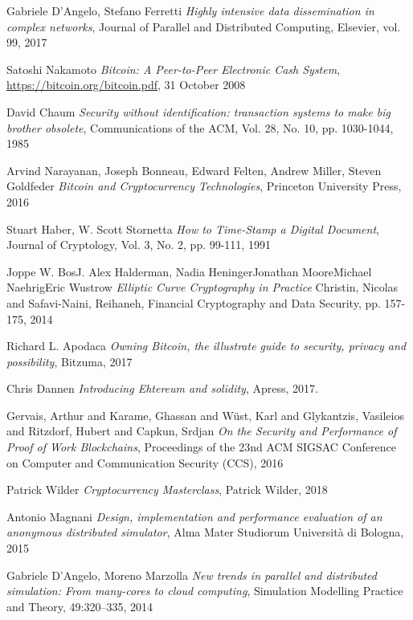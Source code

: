 \begin{thebibliography}{99}

 Gabriele D'Angelo, Stefano Ferretti
{\em Highly intensive data dissemination in complex networks},
Journal of Parallel and Distributed Computing, Elsevier, vol. 99, 2017

 Satoshi Nakamoto
{\em Bitcoin: A Peer-to-Peer Electronic Cash System},
\url{https://bitcoin.org/bitcoin.pdf}, 31 October 2008

 David Chaum
{\em Security without identification: transaction systems to make big brother obsolete},
Communications of the ACM, Vol. 28, No. 10, pp. 1030-1044, 1985

 Arvind Narayanan, Joseph Bonneau, Edward Felten, Andrew Miller, Steven Goldfeder
{\em Bitcoin and Cryptocurrency Technologies},
Princeton University Press, 2016

 Stuart Haber, W. Scott Stornetta
{\em How to Time-Stamp a Digital Document},
Journal of Cryptology, Vol. 3, No. 2, pp. 99-111, 1991

 Joppe W. BosJ. Alex Halderman, Nadia HeningerJonathan MooreMichael NaehrigEric Wustrow
{\em Elliptic Curve Cryptography in Practice}
Christin, Nicolas and Safavi-Naini, Reihaneh, Financial Cryptography and Data Security, pp. 157-175, 2014

 Richard L. Apodaca
{\em Owning Bitcoin, the illustrate guide to security, privacy and possibility},
Bitzuma, 2017

 Chris Dannen
{\em Introducing Ehtereum and solidity},
Apress, 2017.

 Gervais, Arthur and Karame, Ghassan and Wüst, Karl and Glykantzis, Vasileios and Ritzdorf, Hubert and Capkun, Srdjan
{\em On the Security and Performance of Proof of Work Blockchains},
Proceedings of the 23nd ACM SIGSAC Conference on Computer and Communication Security (CCS), 2016

 Patrick Wilder
{\em Cryptocurrency Masterclass},
Patrick Wilder, 2018

 Antonio Magnani
{\em Design, implementation and performance evaluation of an anonymous distributed simulator},
Alma Mater Studiorum Università di Bologna, 2015

 Gabriele D’Angelo, Moreno Marzolla
{\em New trends in parallel and distributed simulation: From many-cores to cloud computing},
Simulation Modelling Practice and Theory, 49:320–335, 2014


\end{thebibliography}
